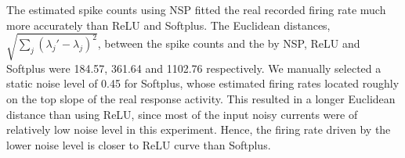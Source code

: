 	The estimated spike counts using NSP fitted the real recorded firing rate much more accurately than ReLU and Softplus.
	The Euclidean distances, $\sqrt{\sum_{j}(\lambda_j' - \lambda_j)^2}$, between the spike counts and the \DIFdelbegin {}\DIFdelend \DIFaddbegin {}\DIFaddend by NSP, ReLU and Softplus were 184.57, 361.64 and 1102.76 respectively.
	We manually selected a static noise level of 0.45 for Softplus, whose estimated firing rates located roughly on the top slope of the real response activity.
	This resulted in a longer Euclidean distance than using ReLU, since most of the input noisy currents were of relatively low noise level in this experiment.
	Hence, the firing rate driven by the lower noise level is closer to \DIFaddbegin {}\DIFaddend ReLU curve than \DIFaddbegin {}\DIFaddend Softplus.

